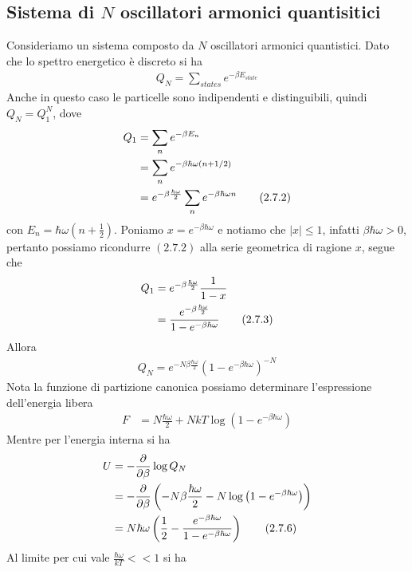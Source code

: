 \documentclass{article}
\begin{document}
\subsection{Sistema di $N$ oscillatori armonici quantisitici}
Consideriamo un sistema composto da $N$ oscillatori armonici quantistici. Dato che lo spettro energetico è discreto si ha 
\begin{align}
    Q_N = \sum_{states} e^{-\beta E_{state}} \tag{2.7.1}
\end{align}
Anche in questo caso le particelle sono indipendenti e distinguibili, quindi $Q_N = Q^N_1$, dove 
\begin{align}
    Q_1 &= \sum_n e^{-\beta E_n} \notag \\
    &= \sum_n e^{-\beta\hbar\omega(n + 1/2)} \notag \\
    &= e^{-\beta\frac{\hbar\omega}{2}}\sum_n e^{-\beta\hbar\omega n} \tag{2.7.2}
\end{align}
con $E_n = \hbar\omega\left(n + \frac{1}{2}\right)$. Poniamo $x = e^{-\beta\hbar\omega}$ e notiamo che $|x| \leq 1$, infatti $\beta\hbar\omega > 0$, pertanto possiamo ricondurre $(2.7.2)$ alla serie geometrica di ragione $x$, segue che 
\begin{align}
    Q_1 &= e^{-\beta\frac{\hbar\omega}{2}}\frac{1}{1 - x} \notag \\
    &= \frac{e^{-\beta\frac{\hbar\omega}{2}}}{1 - e^{-\beta\hbar\omega}} \tag{2.7.3}
\end{align}
Allora 
\begin{align}
    Q_N = e^{-N\beta\frac{\hbar\omega}{2}}\left(1 - e^{-\beta\hbar\omega}\right)^{-N} \tag{2.7.4}
\end{align}
Nota la funzione di partizione canonica possiamo determinare l'espressione dell'energia libera 
\begin{align}
    F &= N\frac{\hbar\omega}{2} + NkT\log\left(1 - e^{-\beta\hbar\omega}\right) \tag{2.7.5}
\end{align}
Mentre per l'energia interna si ha 
\begin{align}
    U &= -\frac{\partial}{\partial\beta}\log Q_N \notag \\
    &= -\frac{\partial}{\partial\beta}\left(-N\beta\frac{\hbar\omega}{2} - N\log\left(1 - e^{-\beta\hbar\omega}\right)\right) \notag \\
    &= N\hbar\omega\left(\frac{1}{2} - \frac{e^{-\beta\hbar\omega}}{1 - e^{-\beta\hbar\omega}}\right) \tag{2.7.6}
\end{align}
Al limite per cui vale $\frac{\hbar\omega}{kT} << 1$ si ha 
\end{document}
